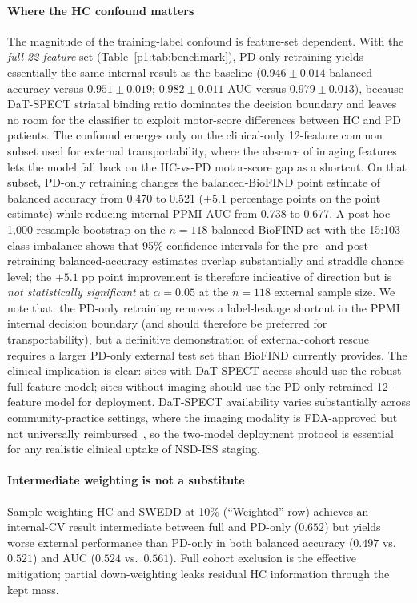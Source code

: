 \documentclass[10pt,letterpaper]{article}
\begin{document}
\paragraph*{Where the HC confound matters} The magnitude of the training-label confound is feature-set dependent. With the \emph{full 22-feature} set (Table~\ref{p1:tab:benchmark}), PD-only retraining yields essentially the same internal result as the baseline ($0.946 \pm 0.014$ balanced accuracy versus $0.951 \pm 0.019$; $0.982 \pm 0.011$ AUC versus $0.979 \pm 0.013$), because DaT-SPECT striatal binding ratio dominates the decision boundary and leaves no room for the classifier to exploit motor-score differences between HC and PD patients. The confound emerges only on the clinical-only 12-feature common subset used for external transportability, where the absence of imaging features lets the model fall back on the HC-vs-PD motor-score gap as a shortcut. On that subset, PD-only retraining changes the balanced-BioFIND point estimate of balanced accuracy from 0.470 to 0.521 ($+5.1$ percentage points on the point estimate) while reducing internal PPMI AUC from 0.738 to 0.677. A post-hoc 1{,}000-resample bootstrap on the $n{=}118$ balanced BioFIND set with the 15:103 class imbalance shows that 95\% confidence intervals for the pre- and post-retraining balanced-accuracy estimates overlap substantially and straddle chance level; the $+5.1$ pp point improvement is therefore indicative of direction but is \emph{not statistically significant} at $\alpha{=}0.05$ at the $n{=}118$ external sample size. We note that: the PD-only retraining removes a label-leakage shortcut in the PPMI internal decision boundary (and should therefore be preferred for transportability), but a definitive demonstration of external-cohort rescue requires a larger PD-only external test set than BioFIND currently provides. The clinical implication is clear: sites with DaT-SPECT access should use the robust full-feature model; sites without imaging should use the PD-only retrained 12-feature model for deployment. DaT-SPECT availability varies substantially across community-practice settings, where the imaging modality is FDA-approved but not universally reimbursed~\cite{seibyl2018dat}, so the two-model deployment protocol is essential for any realistic clinical uptake of NSD-ISS staging.

\paragraph*{Intermediate weighting is not a substitute} Sample-weighting HC and SWEDD at 10\% (``Weighted'' row) achieves an internal-CV result intermediate between full and PD-only ($0.652$) but yields worse external performance than PD-only in both balanced accuracy ($0.497$ vs.\ $0.521$) and AUC ($0.524$ vs.\ $0.561$). Full cohort exclusion is the effective mitigation; partial down-weighting leaks residual HC information through the kept mass.
\end{document}
